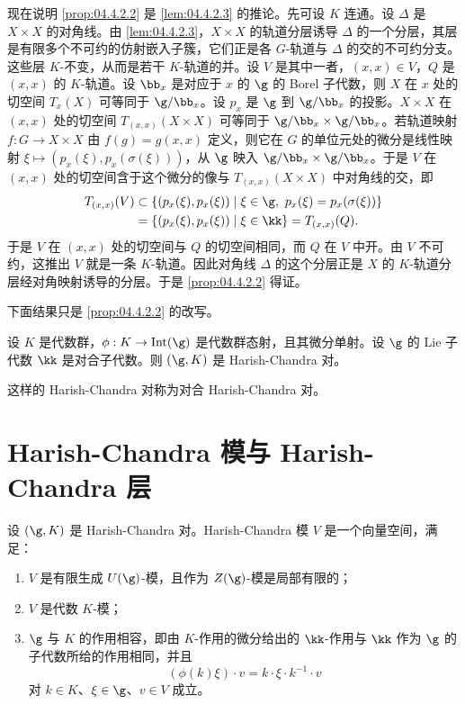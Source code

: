 现在说明 \ref{prop:04.4.2.2} 是 \ref{lem:04.4.2.3} 的推论。先可设 $K$ 连通。设 $\Delta$ 是 $X\times X$ 的对角线。由 \ref{lem:04.4.2.3}，$X\times X$ 的轨道分层诱导 $\Delta$ 的一个分层，其层是有限多个不可约的仿射嵌入子簇，它们正是各 $G$-轨道与 $\Delta$ 的交的不可约分支。这些层 $K$-不变，从而是若干 $K$-轨道的并。设 $V$ 是其中一者，$(x,x)\in V$，$Q$ 是 $(x,x)$ 的 $K$-轨道。设 $\bb_x$ 是对应于 $x$ 的 $\g$ 的 Borel 子代数，则 $X$ 在 $x$ 处的切空间 $T_x(X)$ 可等同于 $\g/\bb_x$。设 $p_x$ 是 $\g$ 到 $\g/\bb_x$ 的投影。$X\times X$ 在 $(x,x)$ 处的切空间 $T_{(x,x)}(X\times X)$ 可等同于 $\g/\bb_x\times\g/\bb_x$。若轨道映射 $f:G\to X\times X$ 由 $f(g)=g(x,x)$ 定义，则它在 $G$ 的单位元处的微分是线性映射 $\xi\mapsto(p_x(\xi),p_x(\sigma(\xi)))$，从 $\g$ 映入 $\g/\bb_x\times\g/\bb_x$。于是 $V$ 在 $(x,x)$ 处的切空间含于这个微分的像与 $T_{(x,x)}(X\times X)$ 中对角线的交，即
\begin{align*}
T_{(x,x)}(V)&\subset\{(p_x(\xi),p_x(\xi))\mid \xi\in\g,\ p_x(\xi)=p_x(\sigma(\xi))\}\\&=\{(p_x(\xi),p_x(\xi))\mid \xi\in\kk\}=T_{(x,x)}(Q).
\end{align*}
于是 $V$ 在 $(x,x)$ 处的切空间与 $Q$ 的切空间相同，而 $Q$ 在 $V$ 中开。由 $V$ 不可约，这推出 $V$ 就是一条 $K$-轨道。因此对角线 $\Delta$ 的这个分层正是 $X$ 的 $K$-轨道分层经对角映射诱导的分层。于是 \ref{prop:04.4.2.2} 得证。

下面结果只是 \ref{prop:04.4.2.2} 的改写。

\begin{theorem}\label{thm:04.4.2.4}
设 $K$ 是代数群，$\phi:K\to\operatorname{Int}(\g)$ 是代数群态射，且其微分单射。设 $\g$ 的 Lie 子代数 $\kk$ 是对合子代数。则 $(\g,K)$ 是 Harish-Chandra 对。
\end{theorem}

这样的 Harish-Chandra 对称为对合 Harish-Chandra 对。

\section{Harish-Chandra 模与 Harish-Chandra 层}
\label{sec:04.4.3}

设 $(\g,K)$ 是 Harish-Chandra 对。Harish-Chandra 模 $V$ 是一个向量空间，满足：
\begin{enumerate}[label=(\roman*)]
\item $V$ 是有限生成 $U(\g)$-模，且作为 $Z(\g)$-模是局部有限的；
\item $V$ 是代数 $K$-模；
\item $\g$ 与 $K$ 的作用相容，即由 $K$-作用的微分给出的 $\kk$-作用与 $\kk$ 作为 $\g$ 的子代数所给的作用相同，并且
$$(\phi(k)\xi)\cdot v=k\cdot\xi\cdot k^{-1}\cdot v$$
对 $k\in K$、$\xi\in\g$、$v\in V$ 成立。
\end{enumerate}

